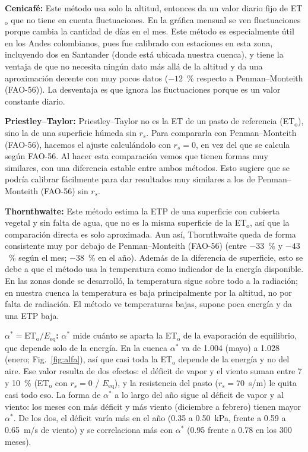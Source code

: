 \documentclass[11pt,letterpaper]{article}
\newcommand{\ETo}{ET$_\mathrm{o}$}
\begin{document}
\textbf{Cenicafé:} Este método usa solo la altitud, entonces da un valor diario fijo de \ETo{} que no tiene en cuenta
fluctuaciones. En la gráfica mensual se ven fluctuaciones porque cambia la cantidad de días en el mes. Este método es
especialmente útil en los Andes colombianos, pues fue calibrado con estaciones en esta zona, incluyendo dos en
Santander (donde está ubicada nuestra cuenca), y tiene la ventaja de que no necesita ningún dato más allá de la altitud y da una aproximación decente con
muy pocos datos ($-12$~\% respecto a Penman--Monteith (FAO-56)). La desventaja es que ignora las fluctuaciones porque es un valor
constante diario.

\textbf{Priestley--Taylor:} Priestley--Taylor no es la ET de un pasto de referencia (\ETo), sino la de una superficie
húmeda sin $r_s$. Para compararla con Penman--Monteith (FAO-56), hacemos el ajuste calculándolo con $r_s = 0$, en vez del que se
calcula según FAO-56. Al hacer esta comparación vemos que tienen formas muy similares, con una diferencia estable entre
ambos métodos. Esto sugiere que se podría calibrar fácilmente para dar resultados muy similares a los de
Penman--Monteith (FAO-56) sin $r_s$.

\textbf{Thornthwaite:} Este método estima la ETP de una superficie con cubierta vegetal y sin falta de agua, que no es
la misma superficie de la \ETo, así que la comparación directa es solo aproximada. Aun así, Thornthwaite queda de forma
consistente muy por debajo de Penman--Monteith (FAO-56) (entre $-33$~\% y $-43$~\% según el mes; $-38$~\% en el año). Además de
la diferencia de superficie, esto se debe a que el método usa la temperatura como indicador de la energía disponible.
En las zonas donde se desarrolló, la temperatura sigue sobre todo a la radiación; en nuestra cuenca la temperatura es
baja principalmente por la altitud, no por falta de radiación. El método ve temperaturas bajas, supone poca energía y
da una ETP baja.

\textbf{$\alpha^* = \mathrm{ET_o}/E_\mathrm{eq}$:} $\alpha^*$ mide cuánto se aparta la \ETo{} de la evaporación de
equilibrio, que depende solo de la energía. En la cuenca $\alpha^*$ va de 1.004 (mayo) a 1.028 (enero; Fig.~\ref{fig:alfa}), así que casi
toda la \ETo{} depende de la energía y no del aire. Ese valor resulta de dos efectos: el déficit de vapor y el viento
suman entre 7 y 10~\% (\ETo{} con $r_s = 0$ / $E_\mathrm{eq}$), y la resistencia del pasto ($r_s = 70$~s/m) le quita
casi todo eso. La forma de $\alpha^*$ a lo largo del año sigue al déficit de vapor y al viento: los meses con más
déficit y más viento (diciembre a febrero) tienen mayor $\alpha^*$. De los dos, el déficit varía más en el año (0.35
a 0.50~kPa, frente a 0.59 a 0.65~m/s de viento) y se correlaciona más con $\alpha^*$ (0.95 frente a 0.78 en los 300
meses).
\end{document}
